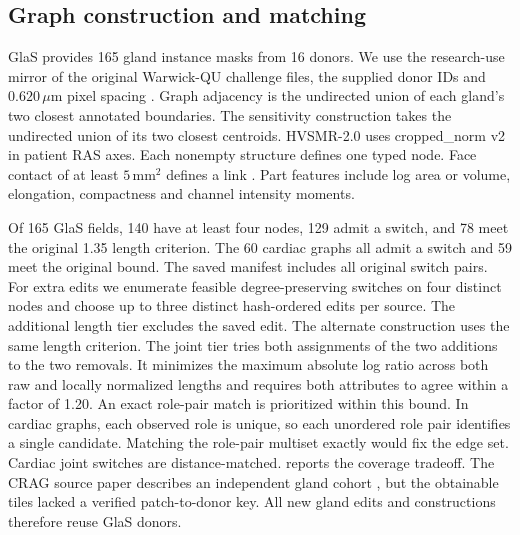\subsection{Graph construction and matching}
GlaS provides 165 gland instance masks from 16 donors. We use the research-use mirror of the original Warwick-QU challenge files, the supplied donor IDs and $0.620\,\mu$m pixel spacing \cite{glas2017}. Graph adjacency is the undirected union of each gland's two closest annotated boundaries. The sensitivity construction takes the undirected union of its two closest centroids. HVSMR-2.0 uses cropped\_norm v2 in patient RAS axes. Each nonempty structure defines one typed node. Face contact of at least $5\,\mathrm{mm}^2$ defines a link \cite{pace2024}. Part features include log area or volume, elongation, compactness and channel intensity moments.

Of 165 GlaS fields, 140 have at least four nodes, 129 admit a switch, and 78 meet the original 1.35 length criterion. The 60 cardiac graphs all admit a switch and 59 meet the original bound. The saved manifest includes all original switch pairs. For extra edits we enumerate feasible degree-preserving switches on four distinct nodes and choose up to three distinct hash-ordered edits per source. The additional length tier excludes the saved edit. The alternate construction uses the same length criterion. The joint tier tries both assignments of the two additions to the two removals. It minimizes the maximum absolute log ratio across both raw and locally normalized lengths and requires both attributes to agree within a factor of 1.20. An exact role-pair match is prioritized within this bound. In cardiac graphs, each observed role is unique, so each unordered role pair identifies a single candidate. Matching the role-pair multiset exactly would fix the edge set. Cardiac joint switches are distance-matched.  reports the coverage tradeoff. The CRAG source paper describes an independent gland cohort \cite{graham2019mild}, but the obtainable tiles lacked a verified patch-to-donor key. All new gland edits and constructions therefore reuse GlaS donors.

\begin{table}[t]
\centering
\caption{\textbf{Coverage, balance, and sensitivity to matching.} D/F/E gives donors, fields or scans, and edits. Raw and local columns give the median and maximum multiplicative imbalance under the \emph{same} correspondence. The original length criterion uses separately sorted raw lengths, so its maximum under the common correspondence can exceed 1.35. Roles counts exact role-pair matches. Gains are against typed centroid distance. Rank minus response compares the GNN's edited-state loss AUROC with its matched absolute probability-change AUROC. Paired intervals are in points.}
\label{tab:balance}
\scriptsize
\setlength{\tabcolsep}{3.5pt}

\end{table}


